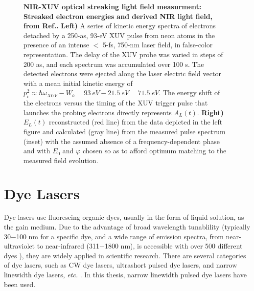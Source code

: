 \begin{figure}[H]
	
	\vspace{-0.5\baselineskip}
	\centering
	\vspace{-6mm}
	\vspace{-3mm}
	\caption[NIR-XUV optical streaking light field measurment: Streaked electron energies and derived NIR light field.]{{\bf NIR-XUV optical streaking light field measurment: Streaked electron energies and derived NIR light field, from Ref.\@ \cite{fsFieldMeasurement2004}.} {\bf Left)} A series of kinetic energy spectra of electrons detached by a 250-as, 93-eV XUV pulse from neon atoms in the presence of an intense $<$ 5-fs, 750-nm laser field, in false-color representation. The delay of the XUV probe was varied in steps of 200 as, and each spectrum was accumulated over 100 s. The detected electrons were ejected along the laser electric field vector with a mean initial kinetic energy of $p_i^2 \approx \hbar\omega_{\scriptscriptstyle {XUV}} - W_b = 93\ eV - 21.5\ eV = 71.5\ eV$. The energy shift of the electrons versus the timing of the XUV trigger pulse that launches the probing electrons directly represents $A_L(t)$. {\bf Right)} $E_L(t)$ reconstructed (red line) from the data depicted in the left figure and calculated (gray line) from the measured pulse spectrum (inset) with the assumed absence of a frequency-dependent phase and with $E_0$ and $\varphi$ chosen so as to afford optimum matching to the measured field evolution.}
	\label{fig:NIR-XUV streak results}
	\vspace{-0.5\baselineskip}
	
\end{figure}

\section{Dye Lasers}
Dye lasers use fluorescing organic dyes, usually in the form of liquid solution, as the gain medium. Due to the advantage of broad wavelength tunablility (typically 30$-$100 nm for a specific dye, and a wide range of emission spectra, from near-ultraviolet to near-infrared (311$-$1800 nm), is accessible with over 500 different dyes \cite{LaserWavelengths}), they are widely applied in scientific research. There are several categories of dye lasers, such as CW dye lasers, ultrashort pulsed dye lasers, and narrow linewidth dye lasers, {\it etc.\@} \cite{DyelaserRev2003}.  In this thesis, narrow linewidth pulsed dye lasers have been used.

